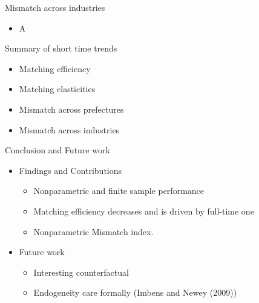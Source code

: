 \documentclass[aspectratio=169]{beamer}
\begin{document}
\begin{frame}{Mismatch across industries}
\begin{itemize}
    \item A
\end{itemize}
\end{frame}

\begin{frame}{Summary of short time trends}
    \begin{itemize}
        \item Matching efficiency
        \item Matching elasticities
        \item Mismatch across prefectures
        \item Mismatch across industries
    \end{itemize}
\end{frame}

\begin{frame}{Conclusion and Future work}
    \begin{itemize}
      \item Findings and Contributions
      \begin{itemize}
          \item Nonparametric and finite sample performance
          \item Matching efficiency decreases and is driven by full-time one
          \item Nonparametric Mismatch index.
      \end{itemize}
      \item Future work
      \begin{itemize}
          \item Interesting counterfactual
          \item Endogeneity care formally (Imbens and Newey (2009))
      \end{itemize}
    \end{itemize}
\end{frame}
\end{document}
